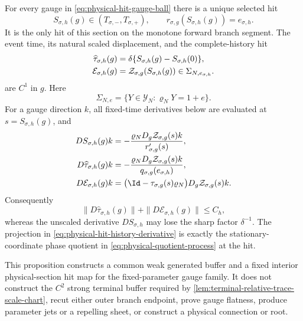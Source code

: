 \begin{proposition}
For every gauge in \cref{eq:physical-hit-gauge-ball} there is a unique
selected hit
\begin{equation}
 S_{\sigma,h}(g)\in(T_{\sigma,-},T_{\sigma,+}),
 \qquad r_{\sigma,g}(S_{\sigma,h}(g))=e_{\sigma,h}.           \label{eq:physical-hit-time}
\end{equation}
It is the only hit of this section on the monotone forward branch segment.
The event time, its natural scaled displacement, and the complete-history
hit
\begin{align}
 \widehat\tau_{\sigma,h}(g)
 &=\delta\{S_{\sigma,h}(g)-S_{\sigma,h}(0)\},\notag\\
 \mathcal E_{\sigma,h}(g)
 &=\mathcal Z_{\sigma,g}(S_{\sigma,h}(g))
   \in\Sigma_{N,e_{\sigma,h}}.                    \label{eq:physical-hit-map}
\end{align}
are \(C^1\) in \(g\).  Here
\begin{equation}
 \Sigma_{N,e}=\{Y\in\mathscr Y_N:\varrho_NY=1+e\}.          \label{eq:physical-hit-section}
\end{equation}
For a gauge direction \(k\), all fixed-time
derivatives below are evaluated at \(s=S_{\sigma,h}(g)\), and
\begin{align}
 DS_{\sigma,h}(g)k
 &=-\frac{\varrho_ND_g\mathcal Z_{\sigma,g}(s)k}
          {r_{\sigma,g}'(s)},\notag\\
 D\widehat\tau_{\sigma,h}(g)k
 &=-\frac{\varrho_ND_g\mathcal Z_{\sigma,g}(s)k}
          {q_{\sigma,g}(e_{\sigma,h})},           \label{eq:physical-hit-time-derivative}\\
 D\mathcal E_{\sigma,h}(g)k
 &=\bigl(\Id-\tau_{\sigma,g}(s)\varrho_N\bigr)
       D_g\mathcal Z_{\sigma,g}(s)k.              \label{eq:physical-hit-history-derivative}
\end{align}
Consequently
\begin{equation}
 \|D\widehat\tau_{\sigma,h}(g)\|
 +\|D\mathcal E_{\sigma,h}(g)\|\le C_h,          \label{eq:physical-hit-map-uniform-bound}
\end{equation}
whereas the unscaled derivative \(DS_{\sigma,h}\) may lose the sharp
factor \(\delta^{-1}\).  The projection in
\cref{eq:physical-hit-history-derivative} is exactly the
stationary-coordinate phase quotient in
\cref{eq:physical-quotient-process} at the hit.

This proposition constructs a common weak generated buffer and a fixed
interior physical-section hit map for the fixed-parameter gauge family.  It
does not construct the \(C^2\) strong terminal buffer required by
\cref{lem:terminal-relative-trace-scale-chart}, recut either outer branch
endpoint, prove gauge flatness, produce parameter jets or a repelling sheet,
or construct a physical connection or root.
\end{proposition}

